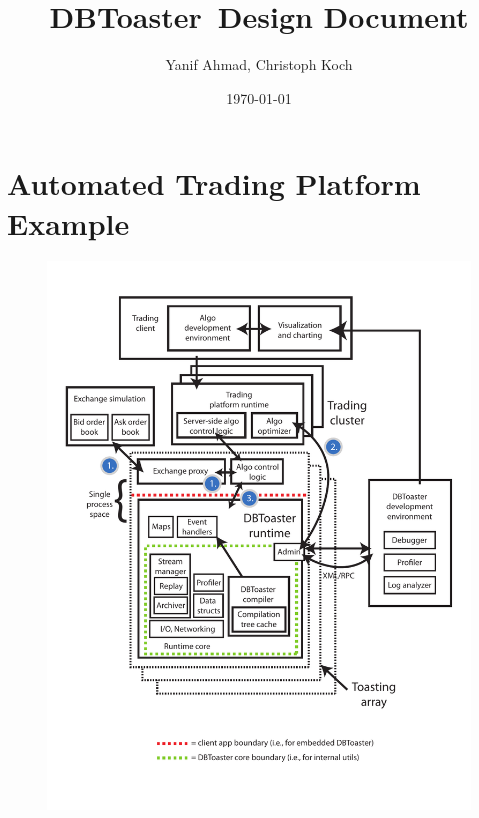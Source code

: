 \documentclass{article}
\newcommand{\compiler}{DBToaster}
\begin{document}
\title{\compiler\ Design Document}
\author{Yanif Ahmad, Christoph Koch}
\date{\today}
\maketitle

\section{Automated Trading Platform Example}

\begin{figure}[h]
\includegraphics[scale=0.8]{../figures/finapp.pdf}
\label{fig:finapp}
\end{figure}
\end{document}
